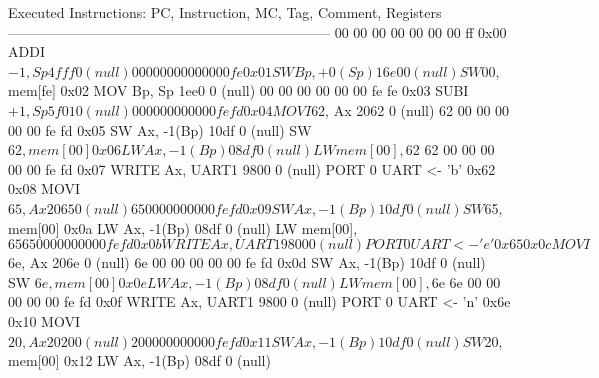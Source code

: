 Executed Instructions:
PC,  Instruction,        MC,    Tag, Comment, Registers
---------------------------------------------------------------------
                                              00 00 00 00 00 00 00 ff
0x00 ADDI  $-1,  Sp      4fff   0   (null)    
                                              00 00 00 00 00 00 00 fe
0x01   SW  Bp,   +0(Sp)  16e0   0   (null)    
                                              SW $00, mem[fe]
0x02 MOV   Bp,   Sp      1ee0   0   (null)    
                                              00 00 00 00 00 00 fe fe
0x03 SUBI  $+1,  Sp      5f01   0   (null)    
                                              00 00 00 00 00 00 fe fd
0x04 MOVI  $62,  Ax      2062   0   (null)    
                                              62 00 00 00 00 00 fe fd
0x05   SW  Ax,   -1(Bp)  10df   0   (null)    
                                              SW $62, mem[00]
0x06   LW  Ax,   -1(Bp)  08df   0   (null)    
                                              LW mem[00], $62
                                              62 00 00 00 00 00 fe fd
0x07 WRITE Ax,   UART1   9800   0   (null)
                                              PORT 0
                                              UART <- 'b' 0x62
0x08 MOVI  $65,  Ax      2065   0   (null)    
                                              65 00 00 00 00 00 fe fd
0x09   SW  Ax,   -1(Bp)  10df   0   (null)    
                                              SW $65, mem[00]
0x0a   LW  Ax,   -1(Bp)  08df   0   (null)    
                                              LW mem[00], $65
                                              65 00 00 00 00 00 fe fd
0x0b WRITE Ax,   UART1   9800   0   (null)
                                              PORT 0
                                              UART <- 'e' 0x65
0x0c MOVI  $6e,  Ax      206e   0   (null)    
                                              6e 00 00 00 00 00 fe fd
0x0d   SW  Ax,   -1(Bp)  10df   0   (null)    
                                              SW $6e, mem[00]
0x0e   LW  Ax,   -1(Bp)  08df   0   (null)    
                                              LW mem[00], $6e
                                              6e 00 00 00 00 00 fe fd
0x0f WRITE Ax,   UART1   9800   0   (null)
                                              PORT 0
                                              UART <- 'n' 0x6e
0x10 MOVI  $20,  Ax      2020   0   (null)
                                              20 00 00 00 00 00 fe fd
0x11   SW  Ax,   -1(Bp)  10df   0   (null)    
                                              SW $20, mem[00]
0x12   LW  Ax,   -1(Bp)  08df   0   (null)    
